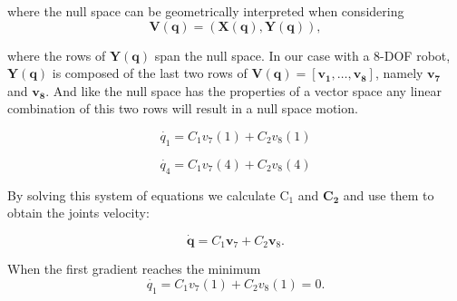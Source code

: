 where the null space can be geometrically interpreted when considering 
\begin{equation}
\mathbf{V}(\mathbf{q})=(\mathbf{X}(\mathbf{q}),\mathbf{Y}(\mathbf{q})) ,
\label{eq:4.32Dietrich}
\end{equation}

where the rows of $\mathbf{Y}(\mathbf{q})$ span the null space. In our case with a 8-DOF robot, $\mathbf{Y}(\mathbf{q})$  is composed of the last two rows of $\mathbf{V}(\mathbf{q}) = [ \mathbf{v_1}, \dots , \mathbf{v_8}]$, namely $\mathbf{v_7}$ and $\mathbf{v_8}$. And like the null space has the properties of a vector space any linear combination of this two rows will result in a null space motion. 

\begin{equation}
\dot{q_1}  = C_1 v_7(1) + C_2 v_8(1) 
\label{eq:}
\end{equation}

\begin{equation}
\dot{q_4} = C_1 v_7(4) + C_2 v_8(4)
\label{eq:}
\end{equation}



By solving this system of equations we calculate $\mathrm{C_1}$ and $\mathbf{C_2}$ and use them to obtain the joints velocity:

\begin{equation}
\mathbf{\dot{q}} = C_1 \mathbf{v}_7 + C_2 \mathbf{v}_8 .
\label{eq:}
\end{equation}

When the first gradient reaches the minimum \begin{equation}
\dot{q_1}  = C_1 v_7(1) + C_2 v_8(1) = 0 .
\label{eq:}
\end{equation}

